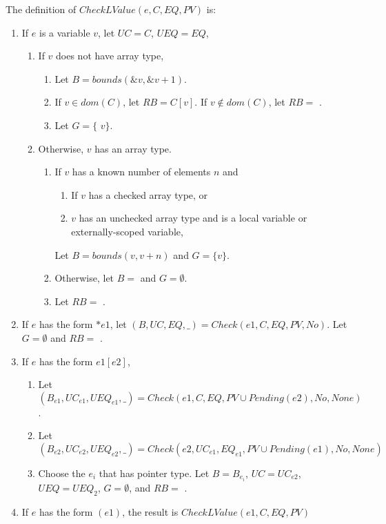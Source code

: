 The definition of $CheckLValue(e, C, EQ, PV)$ is:
\begin{enumerate}
\item If $e$ is a variable $v$, let $\mathit{UC} = C$, $UEQ=EQ$,
\begin{enumerate}
\item If $v$ does not have array type,
\begin{enumerate}
\item Let $B = bounds(\&v,\&v + 1)$.
\item If $v \in dom(C)$, let $RB = C[v]$.  If $v \notin dom(C)$, let $RB =$ \boundsunknown.
\item Let $G=\{$ \code{&}$v \}$.
\end{enumerate}
\item Otherwise, $v$ has an array type.
\begin{enumerate}
\item If $v$ has a known number of elements $n$ and
\begin{enumerate}
\item If $v$ has a checked array type, or
\item $v$ has an unchecked array type and is a local variable or externally-scoped variable,
\end{enumerate}
Let $B = bounds(v, v + n)$ and $G =\{ v \}$.
\item Otherwise, let $B = $ \boundsunknown and $G = \emptyset$.
\item Let $RB = $ \boundsunknown.
\end{enumerate}
\end{enumerate}
\item If $e$ has the form $*e1$,  let $(B, \mathit{UC}, EQ, \_) = Check(e1, C, EQ, PV, No)$.  Let $G =\emptyset$ and $RB = $ \boundsunknown.
\item If $e$ has the form $e1[e2]$,
\begin{enumerate}
\item Let $(B_{e1}, \mathit{UC}_{e1}, {UEQ}_{e1}, \_) = Check(e1, C, EQ, PV \cup Pending(e2), No, 
         None)$.
\item Let $(B_{e2}, \mathit{UC}_{e2}, {UEQ}_{e2}, \_) = Check(e2, \mathit{UC}_{e1}, {EQ}_{e1},
         PV \cup Pending(e1), No, None)$
\item Choose the $e_i$ that has pointer type.   Let $B = B_{e_i}$, $\mathit{UC} = \mathit{UC}_{e2}$, 
$UEQ  = {UEQ}_2$,  $G=\emptyset$, and $RB = $ \boundsunknown.
\end{enumerate}
\item If $e$ has the form $(e1)$, the result is $CheckLValue(e1, C, EQ, PV)$
\end{enumerate}

